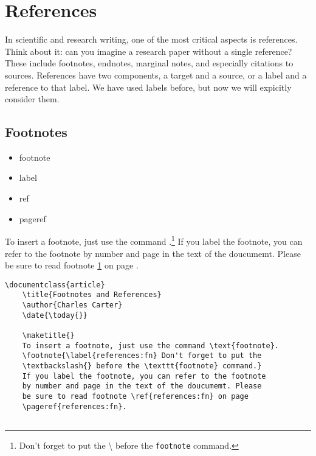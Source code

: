     
    \section{References}
    \label{References}

    In scientific and research writing, one of the most critical aspects is references. Think about it: can you imagine a research paper without a single reference? These include footnotes, endnotes, marginal notes, and especially citations to sources. References have two components, a target and a source, or a label and a reference to that label. We have used labels before, but now we will expicitly consider them.

    \subsection{Footnotes}
    \label{Footnotes}

        \begin{framed}
            \begin{itemize}
                \item{footnote}
                \item{label}
                \item{ref}
                \item{pageref}
            \end{itemize}
        \end{framed}

    To insert a footnote, just use the command .\footnote{\label{references:fn}Don't forget to put the \textbackslash{} before the \texttt{footnote} command.} If you label the footnote, you can refer to the footnote by number and page in the text of the doucumemt. Please be sure to read footnote \ref{references:fn} on page \pageref{references:fn}.

        \begin{verbatim}
\documentclass{article}
    \title{Footnotes and References}
    \author{Charles Carter}
    \date{\today{}}
 
    \maketitle{}
    To insert a footnote, just use the command \text{footnote}.
    \footnote{\label{references:fn} Don't forget to put the 
    \textbackslash{} before the \texttt{footnote} command.} 
    If you label the footnote, you can refer to the footnote 
    by number and page in the text of the doucumemt. Please 
    be sure to read footnote \ref{references:fn} on page 
    \pageref{references:fn}.
    
        \end{verbatim}

